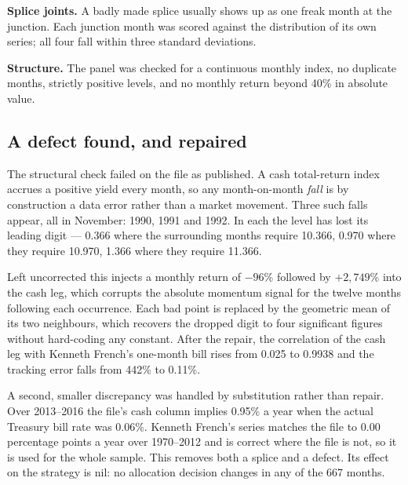 \documentclass[11pt,a4paper]{article}
\let\oldsubsection\subsection
\renewcommand{\subsection}{\FloatBarrier\oldsubsection}
\begin{document}
\textbf{Splice joints.} A badly made splice usually shows up as one freak month
at the junction. Each junction month was scored against the distribution of its
own series; all four fall within three standard deviations.

\textbf{Structure.} The panel was checked for a continuous monthly index, no
duplicate months, strictly positive levels, and no monthly return beyond 40\%
in absolute value.

\subsection*{A defect found, and repaired}

The structural check failed on the file as published. A cash total-return index
accrues a positive yield every month, so any month-on-month \emph{fall} is by
construction a data error rather than a market movement. Three such falls
appear, all in November: 1990, 1991 and 1992. In each the level has lost its
leading digit --- 0.366 where the surrounding months require 10.366, 0.970
where they require 10.970, 1.366 where they require 11.366.

Left uncorrected this injects a monthly return of $-96$\% followed by
$+2{,}749$\% into the cash leg, which corrupts the absolute momentum signal for
the twelve months following each occurrence. Each bad point is replaced by the
geometric mean of its two neighbours, which recovers the dropped digit to four
significant figures without hard-coding any constant. After the repair, the
correlation of the cash leg with Kenneth French's one-month bill rises from
0.025 to 0.9938 and the tracking error falls from 442\% to 0.11\%.

A second, smaller discrepancy was handled by substitution rather than repair.
Over 2013--2016 the file's cash column implies 0.95\% a year when the actual
Treasury bill rate was 0.06\%. Kenneth French's series matches the file to 0.00
percentage points a year over 1970--2012 and is correct where the file is not,
so it is used for the whole sample. This removes both a splice and a defect. Its
effect on the strategy is nil: no allocation decision changes in any of the 667
months.
\end{document}
